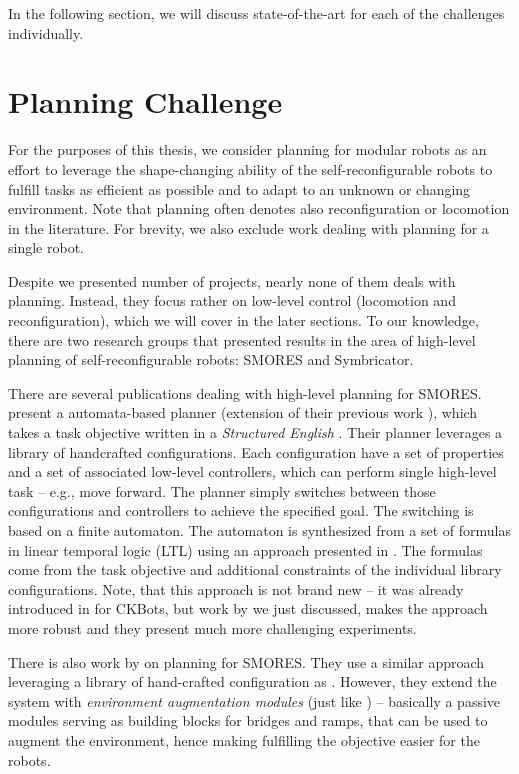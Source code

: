 In the following section, we will discuss state-of-the-art for each of the
challenges individually.

\section{Planning Challenge}\label{sec:chal-planning}

For the purposes of this thesis, we consider planning for modular robots as an
effort to leverage the shape-changing ability of the self-reconfigurable robots
to fulfill tasks as efficient as possible and to adapt to an unknown or changing
environment. Note that planning often denotes also reconfiguration or locomotion
in the literature. For brevity, we also exclude work dealing with planning for a
single robot.

Despite we presented number of projects, nearly none of them deals with
planning. Instead, they focus rather on low-level control (locomotion and
reconfiguration), which we will cover in the later sections. To our knowledge,
there are two research groups that presented results in the area of high-level
planning of self-reconfigurable robots: SMORES and Symbricator.

There are several publications dealing with high-level planning for SMORES.
\textcite{DBLP:journals/arobots/JingTYK18} present a automata-based planner
(extension of their previous work \cite{DBLP:conf/ijcai/JingTYK17}), which takes
a task objective written in a \emph{Structured English}
\cite{DBLP:conf/iros/FinucaneJK10}. Their planner leverages a library of
handcrafted configurations. Each configuration have a set of properties and a
set of associated low-level controllers, which can perform single high-level
task -- e.g., move forward. The planner simply switches between those
configurations and controllers to achieve the specified goal. The switching is
based on a finite automaton. The automaton is synthesized from a set of formulas
in linear temporal logic (LTL) using an approach presented in
\cite{DBLP:journals/trob/Kress-GazitFP09}. The formulas come from the task
objective and additional constraints of the individual library configurations.
Note, that this approach is not brand new -- it was already introduced in
\cite{DBLP:conf/iros/CastroKK11} for CKBots, but work by
\textcite{DBLP:journals/arobots/JingTYK18} we just discussed, makes the approach
more robust and they present much more challenging experiments.

There is also work by \textcite{DBLP:conf/icra/TosunDJKCY18} on planning for
SMORES. They use a similar approach leveraging a library of hand-crafted
configuration as \cite{DBLP:journals/arobots/JingTYK18}. However, they extend
the system with \emph{environment augmentation modules} (just like
\cite{DBLP:conf/rss/PetersenNW11}) -- basically a passive modules serving as
building blocks for bridges and ramps, that can be used to augment the
environment, hence making fulfilling the objective easier for the robots.

